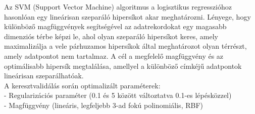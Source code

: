 \documentclass[12pt]{article}
\begin{document}
Az SVM (Support Vector Machine) algoritmus a logisztikus regresszióhoz hasonlóan egy lineárisan szeparáló hipersíkot akar meghatározni\cite{svm}. Lényege, hogy különböző magfüggvények segítségével az adatrekordokat egy magasabb dimenziós térbe képzi le, ahol olyan szeparáló hipersíkot keres, amely maximalizálja a vele párhuzamos hipersíkok által meghatározot olyan térrészt, amely adatpontot nem tartalmaz. A cél a megfelelő magfüggvény és az optimálisabb hipersík megtalálása, amellyel a különböző címkéjű adatpontok lineárisan szeparálhatóak. \\

\noindent A keresztvalidálás során optimalizált paraméterek: \\
- Regularizációs paraméter (0.1 és 5 között változtatva 0.1-es lépésközzel)\\
- Magfüggvény (lineáris, legfeljebb 3-ad fokú polinomiális, RBF)



%
%
%
\end{document}
